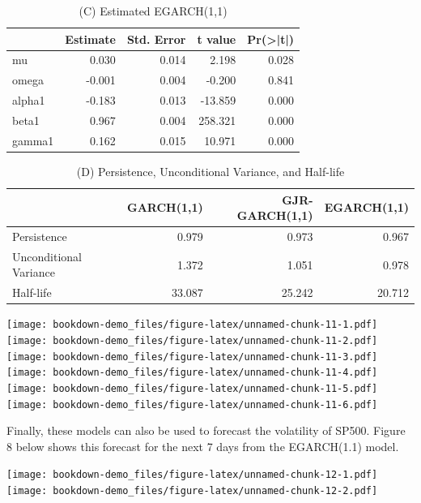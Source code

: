 \documentclass[]{book}
\theoremstyle{definition}
\theoremstyle{definition}
\theoremstyle{definition}
\theoremstyle{remark}
\begin{document}
\begin{table}[t]

\caption{\label{tab:unnamed-chunk-11}(C) Estimated EGARCH(1,1)}
\centering
\begin{tabular}{l|r|r|r|r}
\hline
  &  Estimate &  Std. Error &  t value & Pr(>|t|)\\
\hline
mu & 0.030 & 0.014 & 2.198 & 0.028\\
\hline
omega & -0.001 & 0.004 & -0.200 & 0.841\\
\hline
alpha1 & -0.183 & 0.013 & -13.859 & 0.000\\
\hline
beta1 & 0.967 & 0.004 & 258.321 & 0.000\\
\hline
gamma1 & 0.162 & 0.015 & 10.971 & 0.000\\
\hline
\end{tabular}
\end{table}

\begin{table}[t]

\caption{\label{tab:unnamed-chunk-11}(D) Persistence, Unconditional Variance, and Half-life}
\centering
\begin{tabular}{l|r|r|r}
\hline
  & GARCH(1,1) & GJR-GARCH(1,1) & EGARCH(1,1)\\
\hline
Persistence & 0.979 & 0.973 & 0.967\\
\hline
Unconditional Variance & 1.372 & 1.051 & 0.978\\
\hline
Half-life & 33.087 & 25.242 & 20.712\\
\hline
\end{tabular}
\end{table}

\texttt{[image: bookdown-demo\_files/figure-latex/unnamed-chunk-11-1.pdf]} \texttt{[image: bookdown-demo\_files/figure-latex/unnamed-chunk-11-2.pdf]} \texttt{[image: bookdown-demo\_files/figure-latex/unnamed-chunk-11-3.pdf]} \texttt{[image: bookdown-demo\_files/figure-latex/unnamed-chunk-11-4.pdf]} \texttt{[image: bookdown-demo\_files/figure-latex/unnamed-chunk-11-5.pdf]} \texttt{[image: bookdown-demo\_files/figure-latex/unnamed-chunk-11-6.pdf]}

Finally, these models can also be used to forecast the volatility of SP500. Figure 8 below shows this forecast for the next 7 days from the EGARCH(1.1) model.

\texttt{[image: bookdown-demo\_files/figure-latex/unnamed-chunk-12-1.pdf]} \texttt{[image: bookdown-demo\_files/figure-latex/unnamed-chunk-12-2.pdf]}
\end{document}
